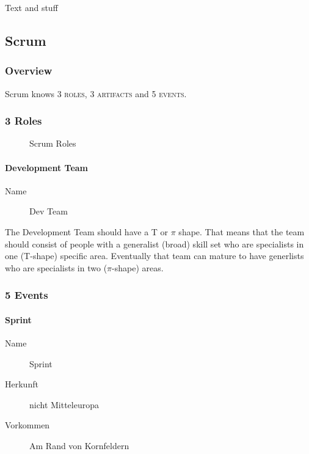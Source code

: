 Text and stuff

\subsection{Scrum}

\subsubsection{Overview}

Scrum knows \textsc{3 roles}, \textsc{3 artifacts} and \textsc{5 events}.\newline


\subsubsection{3 Roles}
\begin{figure}[H] %
\caption{Scrum Roles}
\label{fig:scrum:roles}
\end{figure}

\paragraph{Development Team}
\begin{description}
   \item [Name] Dev Team
\end{description}
The Development Team should have a T \cite{wiki:tshaped} or $\pi$ shape. That means that the team should consist of people with a generalist (broad) skill set who are specialists in one (T-shape) specific area. Eventually that team can mature to have generlists who are specialists in two ($\pi$-shape) areas.

\subsubsection{5 Events}

\paragraph{Sprint}
\begin{description}
   \item [Name] Sprint
   \item [Herkunft] nicht Mitteleuropa
   \item [Vorkommen] Am Rand von Kornfeldern
\end{description}

